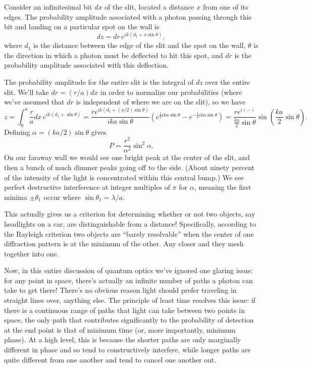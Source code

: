 \documentclass[../p051main.tex]{subfiles}
\begin{document}
Consider an infinitesimal bit $dx$ of the slit, located a distance $x$ from one of its edges.
The probability amplitude associated with a photon passing through this bit and landing on a particular spot on the wall is
\[ dz = dr \,e^{ik(d_1 + x \sin \theta)}, \]
where $d_1$ is the distance between the edge of the slit and the spot on the wall, $\theta$ is the direction in which a photon must be deflected to hit this spot, and $dr$ is the probability amplitude associated with this deflection.

The probability amplitude for the entire slit is the integral of $dz$ over the entire slit.
We'll take $dr = (r / a) dx$ in order to normalize our probabilities (where we've assumed that $dr$ is independent of where we are on the slit), so we have
\[ z = \int_{0}^{a} \frac{r}{a} dx \,e^{ik(d_1 + \sin\theta)} = \frac{r e^{ik(d_1 + (a/2)\sin \theta)}}{ika\sin \theta} \left( e^{\frac{1}{2}ika\sin \theta} - e^{-\frac{1}{2}ika\sin \theta} \right) = \frac{r e^{i(\cdots)}}{\frac{ka}{2}\sin \theta} \sin \left( \frac{ka}{2}\sin \theta \right). \]
Defining $\alpha = (ka / 2)\sin \theta$ gives
\[ P = \frac{r^2}{\alpha^2} \sin^2 \alpha. \]
On our faraway wall we would see one bright peak at the center of the slit, and then a bunch of much dimmer peaks going off to the side.
(About ninety percent of the intensity of the light is concentrated within this central bump.)
We see perfect destructive interference at integer multiples of $\pi$ for $\alpha$, meaning the first minima $\pm\theta_1$ occur where $\sin\theta_1 = \lambda / a$.

This actually gives us a criterion for determining whether or not two objects, say headlights on a car, are distinguishable from a distance!
Specifically, according to the Rayleigh criterion two objects are ``barely resolvable'' when the center of one diffraction pattern is at the minimum of the other.
Any closer and they mesh together into one.

Now, in this entire discussion of quantum optics we've ignored one glaring issue: for any point in space, there's actually an infinite number of paths a photon can take to get there!
There's no obvious reason light should prefer traveling in straight lines over, anything else.
The principle of least time resolves this issue: if there is a continuous range of paths that light can take between two points in space, the only path that contributes significantly to the probability of detection at the end point is that of minimum time (or, more importantly, minimum phase).
At a high level, this is because the shorter paths are only marginally different in phase and so tend to constructively interfere, while longer paths are quite different from one another and tend to cancel one another out.
\end{document}
